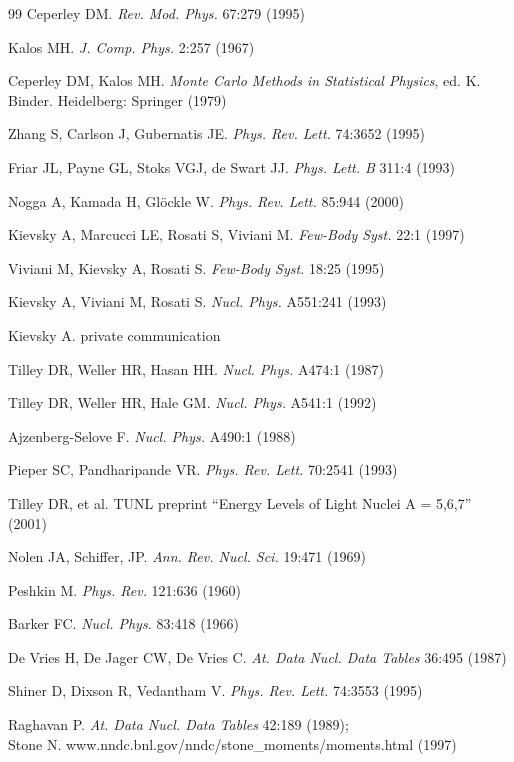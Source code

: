 \begin{thebibliography}{99}
Ceperley DM.
{\it Rev. Mod. Phys.} 67:279 (1995)

Kalos MH.
{\it J. Comp. Phys.} 2:257 (1967)

Ceperley DM, Kalos MH.
{\em Monte Carlo Methods in Statistical Physics},
ed. K. Binder.
Heidelberg: Springer (1979)

Zhang S, Carlson J, Gubernatis JE.
{\it Phys. Rev. Lett.} 74:3652 (1995)

Friar JL, Payne GL, Stoks VGJ, de Swart JJ.
{\it Phys. Lett. B} 311:4 (1993)

Nogga A, Kamada H, Gl\"ockle W.
{\it Phys. Rev. Lett.} 85:944 (2000)

Kievsky A, Marcucci LE, Rosati S, Viviani M.
{\it Few-Body Syst.} 22:1 (1997)

Viviani M, Kievsky A, Rosati S.
{\it Few-Body Syst.} 18:25 (1995)

Kievsky A, Viviani M, Rosati S.
{\it Nucl. Phys.} A551:241 (1993)

Kievsky A. private communication

Tilley DR, Weller HR, Hasan HH.
{\it Nucl. Phys.} A474:1 (1987)

Tilley DR, Weller HR, Hale GM.
{\it Nucl. Phys.} A541:1 (1992)

Ajzenberg-Selove F.
{\it Nucl. Phys.} A490:1 (1988)

Pieper SC, Pandharipande VR.
{\it Phys. Rev. Lett.} 70:2541 (1993)

Tilley DR, et al.
TUNL preprint ``Energy Levels of Light Nuclei A = 5,6,7'' (2001)

Nolen JA, Schiffer, JP.
{\it Ann. Rev. Nucl. Sci.} 19:471 (1969)

Peshkin M.
{\it Phys. Rev.} 121:636 (1960)

Barker FC.
{\it Nucl. Phys.} 83:418 (1966)

De Vries H, De Jager CW, De Vries C.
{\it At. Data Nucl. Data Tables} 36:495 (1987)

Shiner D, Dixson R, Vedantham V.
{\it Phys. Rev. Lett.} 74:3553 (1995)

Raghavan P.
{\it At. Data Nucl. Data Tables} 42:189 (1989);\\
Stone N. www.nndc.bnl.gov/nndc/stone\_moments/moments.html (1997)


\end{thebibliography}
